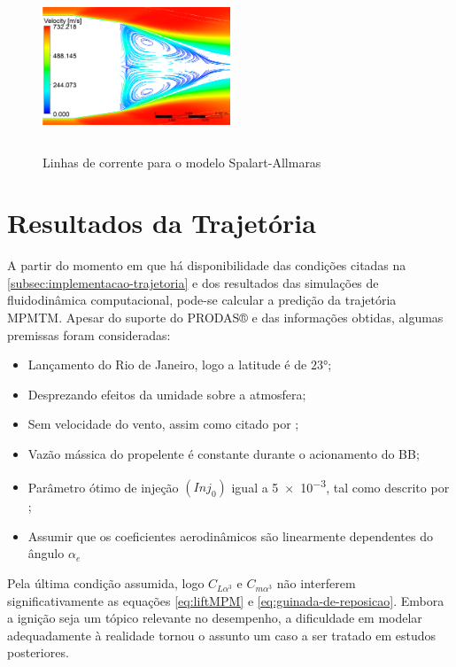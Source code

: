 \begin{figure}[!ht]
    \centering
    \includegraphics[height=5cm,width=0.5\textwidth]{corrente-velocidade-SPALART-2pol.png}
 	\caption{Linhas de corrente para o modelo Spalart-Allmaras}
    \label{fig:corrente-velocidade-bb-RANS}
\end{figure}

\section{Resultados da Trajetória}\label{sec:resultados-trajetoria}

A partir do momento em que há disponibilidade das condições citadas na \autoref{subsec:implementacao-trajetoria} e dos resultados das simulações de fluidodinâmica computacional, pode-se calcular a predição da trajetória MPMTM. Apesar do suporte do PRODAS® e das informações obtidas, algumas premissas foram consideradas:

\begin{itemize}
    \item Lançamento do Rio de Janeiro, logo a latitude é de $\ang{23}$;
    \item Desprezando efeitos da umidade sobre a atmosfera;
    \item Sem velocidade do vento, assim como citado por \citeauthor{Rosendo2020};
    \item Vazão mássica do propelente é constante durante o acionamento do BB;
    \item Parâmetro ótimo de injeção $\left(Inj_{0}\right)$ igual a \num{5e-3}, tal como descrito por \citeauthor{DAVENAS1993329};
    \item Assumir que os coeficientes aerodinâmicos são linearmente dependentes do ângulo $\alpha_{e}$
\end{itemize}

Pela última condição assumida, logo $C_{L\alpha^{3}}$ e $C_{m\alpha^{3}}$ não interferem significativamente as equações \ref{eq:liftMPM} e \ref{eq:guinada-de-reposicao}. Embora a ignição seja um tópico relevante no desempenho, a dificuldade em modelar adequadamente à realidade tornou o assunto um caso a ser tratado em estudos posteriores.

